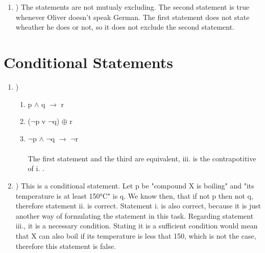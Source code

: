 \documentclass{article}
\begin{document}
\begin{enumerate}[label=\alph*]
\begin{enumerate}[label=\alph*]
	\item) The statements are not mutualy excluding. The second statement is true  whenever Oliver doesn't speak German. The first statement does not state wheather he does or not, so it does not exclude the second statement.

\end{enumerate}


\section{Conditional Statements}

\begin{enumerate}[label=\alph*]
	\item)
	\begin{enumerate}[label=\roman*]
		p: it walks like a duck \\
		q: it talks like a duck \\
		r: it is a duck 
		\item p $\land$ q $\rightarrow$ r
		\item ($\neg$p v $\neg$q) $\oplus$ r
		\item $\neg$p $\land$ $\neg$q $\rightarrow$ $\neg$r \\
		\\
		The first statement and the third are equivalent, iii. is the contrapotitive of i. . 
	
	\end{enumerate}
	
	\item) This is a conditional statement. Let p be "compound X is boiling" and "its temperature is at least 150°C" is q.
	We know then, that if not p then not q, therefore statement ii. is correct.
	Statement i. is also correct, because it is just another way of formulating the statement in this task.
	Regarding statement iii., it is a necessary condition. Stating it is a sufficient condition would mean that X can also boil if its temperature is less that 150, which is not the case, therefore this statement is false.
	
	\end{enumerate}
\end{enumerate}
\end{document}
